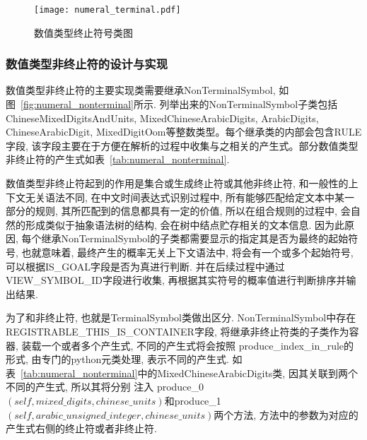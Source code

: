 \begin{figure}[h]
    \centering
    \texttt{[image: numeral\_terminal.pdf]}
    \caption{数值类型终止符号类图}
    \label{fig:numeral_terminal}
\end{figure}


\subsubsection{数值类型非终止符的设计与实现}

数值类型非终止符的主要实现类需要继承NonTerminalSymbol, 如图~\ref{fig:numeral_nonterminal}所示.
列举出来的NonTerminalSymbol子类包括ChineseMixedDigitsAndUnits, MixedChineseArabicDigits, ArabicDigits, ChineseArabicDigit, MixedDigitOom等整数类型。每个继承类的内部会包含RULE字段, 该字段主要在于方便在解析的过程中收集与之相关的产生式。部分数值类型非终止符的产生式如表~\ref{tab:numeral_nonterminal}.

数值类型非终止符起到的作用是集合或生成终止符或其他非终止符, 和一般性的上下文无关语法不同, 在中文时间表达式识别过程中, 所有能够匹配给定文本中某一部分的规则,
其所匹配到的信息都具有一定的价值, 所以在组合规则的过程中, 会自然的形成类似于抽象语法树的结构, 会在树中结点贮存相关的文本信息.
因为此原因, 每个继承NonTerminalSymbol的子类都需要显示的指定其是否为最终的起始符号, 也就意味着, 最终产生的概率无关上下文语法中, 将会有一个或多个起始符号, 可以根据IS\_GOAL字段是否为真进行判断.
并在后续过程中通过VIEW\_SYMBOL\_ID字段进行收集, 再根据其实符号的概率值进行判断排序并输出结果.

为了和非终止符, 也就是TerminalSymbol类做出区分.
NonTerminalSymbol中存在REGISTRABLE\_THIS\_IS\_CONTAINER字段,
将继承非终止符类的子类作为容器, 装载一个或者多个产生式, 不同的产生式将会按照
produce\_index\_in\_rule的形式, 由专门的python元类处理, 表示不同的产生式. 如表~\ref{tab:numeral_nonterminal}中的MixedChineseArabicDigits类, 因其关联到两个不同的产生式, 所以其将分别
注入 produce\_0$\left(self, mixed\_digits, chinese\_units\right)$和produce\_1$\left(self, arabic\_unsigned\_integer, chinese\_units\right)$两个方法, 方法中的参数为对应的产生式右侧的终止符或者非终止符.


